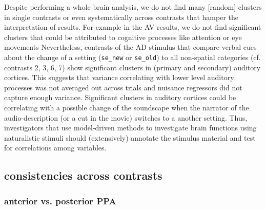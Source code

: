 \documentclass[english]{article}
\begin{document}
Despite performing a whole brain analysis, we do not find many [random] clusters
in single contrasts or even systematically across contrasts that hamper the
interpretation of results.
For example in the AV results, we do not find significant clusters that could be
attributed to cognitive processes like attention or eye movements
Nevertheless, contrasts of the AD stimulus that compare verbal cues about the
change of a setting (\texttt{se\_new} or \texttt{se\_old}) to all non-spatial
categories (cf. contrasts 2, 3, 6, 7) show significant clusters in (primary and
secondary) auditory cortices.
This suggests that variance correlating with lower level auditory processes was
not averaged out across trials and nuisance regressors did not capture enough
variance.
Significant clusters in auditory cortices could be correlating with a possible
change of the soundscape when the narrator of the audio-description (or a cut in
the movie) switches to a another setting.
Thus, investigators that use model-driven methods to investigate brain functions
using naturalistic stimuli should (extensively) annotate the stimulus material
and test for correlations among variables.


\subsection{consistencies across contrasts}

\subsubsection{anterior vs. posterior PPA}

\end{document}
